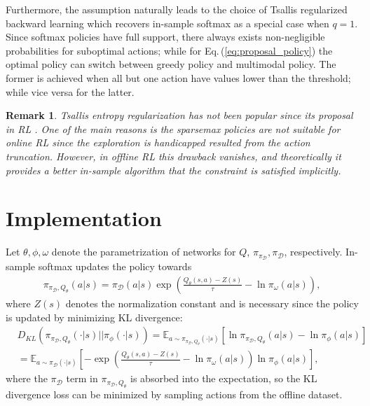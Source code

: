 \documentclass{article}
\newtheorem*{remark}{Remark}
\newcommand{\AdaBracket}[1]{\left(#1\right)}
\newcommand{\AdaRectBracket}[1]{\left[#1\right]}
\newcommand{\expectation}[2]{\mathbb{E}_{#1}\AdaRectBracket{#2}}
\newcommand{\KLany}[2]{D_{\!K\!L}\!\left(#1 \left|  \right| #2 \right)}
\newcommand{\eq}[1]{Eq.\,(#1)}
\newcommand{\datasetPolicy}{\pi_{\mathcal{D}}}
\begin{document}
Furthermore, the assumption naturally leads to the choice of Tsallis regularized backward learning which recovers in-sample softmax as a special case when $q=1$.
Since softmax policies have full support, there always exists non-negligible probabilities for suboptimal actions; while for \eq{\ref{eq:proposal_policy}} the optimal policy can switch between greedy policy and multimodal policy.
The former is achieved when all but one action have values lower than the threshold; while vice versa for the latter.

\begin{remark}
    Tsallis entropy regularization has not been popular since its proposal in RL \cite{Lee2018-TsallisRAL}.
    One of the main reasons is the sparsemax policies are not suitable for online RL since the exploration is handicapped resulted from the action truncation.
    However, in offline RL this drawback vanishes, and theoretically it provides a better in-sample algorithm that the constraint is satisfied implicitly. 
\end{remark}


\section{Implementation}

Let $\theta, \phi, \omega$ denote the parametrization of networks for $Q$, $\pi_{\datasetPolicy}, \datasetPolicy$, respectively.
In-sample softmax updates the policy towards 
\begin{align}
    \pi_{\datasetPolicy, Q_{\theta}}(a|s) = \datasetPolicy(a|s)\exp\AdaBracket{\frac{Q_{\theta}(s,a) - Z(s)}{\tau} - \ln \pi_{\omega}(a|s)},
    \label{eq:insample_policy}
\end{align}
where $Z(s)$ denotes the normalization constant and is necessary since the policy is updated by minimizing KL divergence:
\begin{align*}
    &\KLany{\pi_{\datasetPolicy, Q_{\theta}}(\cdot|s)}{\pi_{\phi}(\cdot | s)} = \expectation{a \sim \pi_{\datasetPolicy, Q_{\theta}}(\cdot|s) }{\ln \pi_{\datasetPolicy, Q_{\theta}}(a|s) - \ln \pi_{\phi}(a | s)} \\
    &= \expectation{a \sim \datasetPolicy(\cdot|s)}{ - \exp\AdaBracket{\frac{Q_{\theta}(s,a) - Z(s)}{\tau} - \ln \pi_{\omega}(a|s)} \ln\pi_{\phi}(a|s) },
\end{align*} 
where the $\datasetPolicy$ term in $ \pi_{\datasetPolicy, Q_{\theta}}$ is absorbed into the expectation, so the KL divergence loss can be minimized by sampling actions from the offline dataset.
\end{document}
